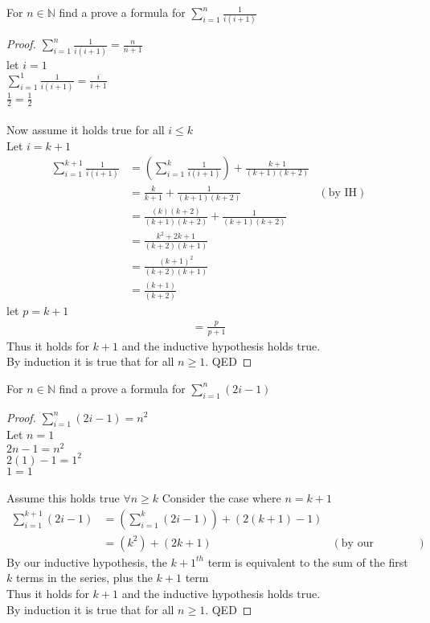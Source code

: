 \documentclass[12pt]{article}
\newcommand{\N}{\mathbb{N}}
\newenvironment{theorem}[2][Theorem]{\begin{trivlist}
\item[\hskip \labelsep {\bfseries #1}\hskip \labelsep {\bfseries #2.}]}{\end{trivlist}}
\begin{document}
\begin{theorem}{3.28}
For $n\in \N$ find a prove a formula for $\sum_{i=1}^{n}\frac{1}{i(i+1)}$
\begin{proof}
$\sum_{i=1}^{n}\frac{1}{i(i+1)} = \frac{n}{n+1}$\\
let $i=1$\\
$\sum_{i=1}^{1}\frac{1}{i(i+1)} = \frac{i}{i+1}$\\
$\frac{1}{2} = \frac{1}{2}$\\ \\
Now assume it holds true for all $i \leq k$\\
Let $i=k+1$
\begin{align*}
\sum_{i=1}^{k+1}\frac{1}{i(i+1)} & = \left(\sum_{i=1}^{k}\frac{1}{i(i+1)}\right)+\frac{k+1}{(k+1)(k+2)} \\
& = \frac{k}{k+1}+\frac{1}{(k+1)(k+2)} & (\text{by IH})\\
& = \frac{(k)(k+2)}{(k+1)(k+2)}+\frac{1}{(k+1)(k+2)}\\
& = \frac{k^2+2k+1}{(k+2)(k+1)}\\
& = \frac{(k+1)^2}{(k+2)(k+1)}\\
& = \frac{(k+1)}{(k+2)}
\end{align*}
let $p=k+1$
\begin{align*}
= \frac{p}{p+1}	
\end{align*}
Thus it holds for $k+1$ and the inductive hypothesis holds true.\\
By induction it is true that for all $n \geq 1$. QED
\end{proof}
\end{theorem}
\begin{theorem}{3.29}
For $n\in \N$ find a prove a formula for $\sum_{i=1}^{n}(2i-1)$
\end{theorem}
\begin{proof}
$\sum_{i=1}^{n}(2i-1) = n^2$\\
Let $n = 1$\\
$2n-1 = n^2$\\
$2(1)-1 = 1^2$\\
$1 = 1$\\ \\
Assume this holds true $\forall n \geq k$
Consider the case where $n = k+1$
\begin{align*}
\sum_{i=1}^{k+1}(2i-1) &= \left(\sum_{i=1}^{k}(2i-1)\right) + (2(k+1)-1)\\
& = (k^2)+(2k+1) & (\text{by our inductive hypothesis})
\end{align*}
By our inductive hypothesis, the $k+1^{th}$ term is equivalent to the sum of the first $k$ terms in the series, plus the $k+1$ term\\
Thus it holds for $k+1$ and the inductive hypothesis holds true.\\
By induction it is true that for all $n \geq 1$. QED
\end{proof}
\end{document}
